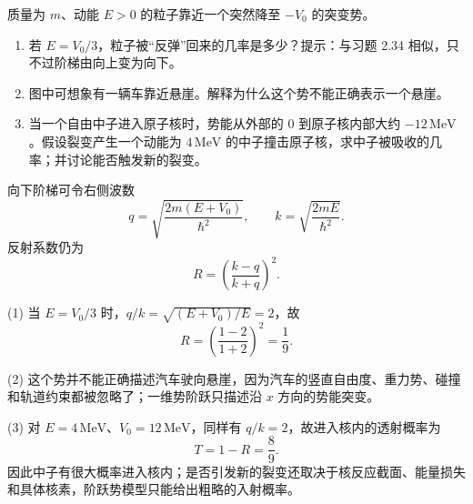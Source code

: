 \begin{question}
质量为 $m$、动能 $E>0$ 的粒子靠近一个突然降至 $-V_0$ 的突变势。
\begin{enumerate}
\item 若 $E=V_0/3$，粒子被“反弹”回来的几率是多少？提示：与习题 2.34 相似，只不过阶梯由向上变为向下。
\item 图中可想象有一辆车靠近悬崖。解释为什么这个势不能正确表示一个悬崖。
\item 当一个自由中子进入原子核时，势能从外部的 $0$ 到原子核内部大约 $-12\,\mathrm{MeV}$。假设裂变产生一个动能为 $4\,\mathrm{MeV}$ 的中子撞击原子核，求中子被吸收的几率；并讨论能否触发新的裂变。
\end{enumerate}
\end{question}
\begin{solution}
向下阶梯可令右侧波数
\[
q=\sqrt{\frac{2m(E+V_0)}{\hbar^2}},
\qquad
k=\sqrt{\frac{2mE}{\hbar^2}}.
\]
反射系数仍为
\[
R=\left(\frac{k-q}{k+q}\right)^2.
\]

(1) 当 $E=V_0/3$ 时，$q/k=\sqrt{(E+V_0)/E}=2$，故
\[
R=\left(\frac{1-2}{1+2}\right)^2=\frac19.
\]

(2) 这个势并不能正确描述汽车驶向悬崖，因为汽车的竖直自由度、重力势、碰撞和轨道约束都被忽略了；一维势阶跃只描述沿 $x$ 方向的势能突变。

(3) 对 $E=4\,\mathrm{MeV}$、$V_0=12\,\mathrm{MeV}$，同样有 $q/k=2$，故进入核内的透射概率为
\[
T=1-R=\frac89.
\]
因此中子有很大概率进入核内；是否引发新的裂变还取决于核反应截面、能量损失和具体核素，阶跃势模型只能给出粗略的入射概率。
\end{solution}

